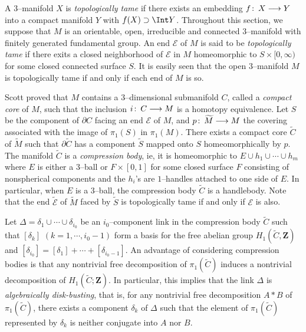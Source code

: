 \documentclass{gtart_a}
\theoremstyle{definition}
\numberwithin{equation}{section}
\begin{document}
A $3$--manifold $X$ is \emph{topologically tame\/} if there exists an embedding $f\mskip0.5mu\colon\thinspace X\longrightarrow Y$ into a compact 
manifold $Y$ with $f(X)\supset \Int Y$.
Throughout this section, we suppose that $M$ is an orientable, open, irreducible and connected $3$--manifold with 
finitely generated fundamental group.
An end $\mathcal{E}$ of $M$ is said to be \emph{topologically tame\/} if there exits a closed neighborhood of 
$\mathcal{E}$ in $M$ homeomorphic to $S\times [0,\infty)$ for some closed connected surface $S$.
It is easily seen that the open $3$--manifold $M$ is topologically tame if and only if each end of $M$ is so.

Scott \cite{sc} proved that $M$ contains a $3$--dimensional submanifold $C$, called a \emph{compact core\/} of $M$, 
such that the inclusion $i\mskip0.5mu\colon\thinspace C\longrightarrow M$ is a homotopy equivalence.
Let $S$ be the component of $\partial C$ facing an end $\mathcal{E}$ of $M$, and $p\co \tilde M\longrightarrow M$ 
the covering associated with the image of $\pi_1(S)$ in $\pi_1(M)$.
There exists a compact core $\tilde C$ of $\tilde M$ such that $\partial \tilde C$ has a component $\tilde S$ 
mapped onto $S$ homeomorphically by $p$.
The manifold $\tilde C$ is a \emph{compression body\/}, ie, it is homeomorphic to $E\cup h_1\cup\cdots \cup h_m$ 
where $E$ is either a $3$--ball or $F\times [0,1]$ for some closed surface $F$ consisting of nonspherical components 
and the $h_i$'s are $1$--handles attached to one side of $E$.
In particular, when $E$ is a $3$--ball, the compression body $\tilde C$ is a handlebody.
Note that the end $\tilde{\mathcal{E}}$ of $\tilde M$ faced by $\tilde S$ is topologically tame if and only if 
$\mathcal{E}$ is also.


Let $\Delta=\delta_1\cup \cdots\cup \delta_{i_0}$ be an $i_0$--component link in the compression body $\tilde C$ 
such that $[\delta_k]$ $(k=1,\cdots,i_0-1)$ form a basis for the free abelian group $H_1(\tilde C,\mathbf{Z})$ 
and $[\delta_{i_0}]=[\delta_1]+\cdots+[\delta_{i_0-1}]$.
An advantage of considering compression bodies is that any nontrivial free decomposition of $\pi_1(\tilde C)$ 
induces a nontrivial decomposition of $H_1(\tilde C;\mathbf{Z})$.
In particular, this implies that the link $\Delta$ is \emph{algebraically disk-busting\/}, that is, for any 
nontrivial free decomposition $A*B$ of $\pi_1(\tilde C)$, there exists a component $\delta_k$ of $\Delta$ such 
that the element of $\pi_1(\tilde C)$ represented by $\delta_k$ is neither conjugate into $A$ nor $B$.
\end{document}
